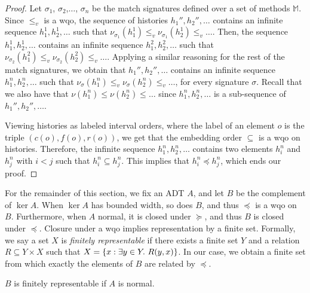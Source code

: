 \begin{proof}
Let $\sigma_1$, $\sigma_2$,$\ldots$, $\sigma_n$ be the match signatures defined over a set of methods $\mathbb{M}$.
Since $\leq_v$ is a wqo, the sequence of histories $h_1'',h_2'',\ldots$ contains an 
infinite sequence $h_{1}^1,h_{2}^1,\ldots$ such that 
$\nu_{\sigma_1}(h_{1}^1)\leq_v \nu_{\sigma_1}(h_{2}^1)\leq_v \ldots$.
Then, the sequence $h_{1}^1,h_{2}^1,\ldots$ contains 
an infinite sequence $h_{1}^2,h_{2}^2,\ldots$ such that 
$\nu_{\sigma_2}(h_{1}^2)\leq_v \nu_{\sigma_2}(h_{2}^2)\leq_v \ldots$.
Applying a similar reasoning for the rest of the match signatures, 
we obtain that $h_1'',h_2'',\ldots$ contains an 
infinite sequence $h_{1}^n,h_{2}^n,\ldots$
such that 
$\nu_{\sigma}(h_{1}^n)\leq_v \nu_{\sigma}(h_{2}^n)\leq_v \ldots$, for every signature $\sigma$.
Recall that we also have that
$\nu(h_1^n)\leq\nu(h_2^n)\leq\ldots$ since $h_{1}^n,h_{2}^n,\ldots$ is a sub-sequence of $h_1'',h_2'',\ldots$.

Viewing histories as labeled interval orders, where the label of an element $o$ is the triple $(c(o),f(o),r(o))$,
we get that the embedding order $\subseteq$ is a wqo on histories. Therefore, the infinite sequence
$h_{1}^n,h_{2}^n,\ldots$  contains two elements $h_{i}^n$ and $h_j^n$ with $i<j$ such that $h_{i}^n\subseteq h_j^n$.
This implies that $h_i^n\preceq h_j^n$, which ends our proof.
\end{proof}

For the remainder of this section, we fix an ADT $A$, and let $B$ be the
complement of $\ker A$. When $\ker A$ has bounded width, so does $B$, and thus
$\preceq$ is a wqo on $B$. Furthermore, when $A$ normal, it is closed under
$\succeq$, and thus $B$ is closed under $\preceq$. Closure under a wqo implies
representation by a finite set. Formally, we say a set $X$ is \emph{finitely
representable} if there exists a finite set $Y$ and a relation $R \subseteq Y
\times X$ such that $X = {\{{ x : \exists y\in Y.\ R(y,x) }\}}$. In our case, we
obtain a finite set from which exactly the elements of $B$ are related by
$\preceq$.

\begin{lemma}

  $B$ is finitely representable if $A$ is normal.

\end{lemma}

